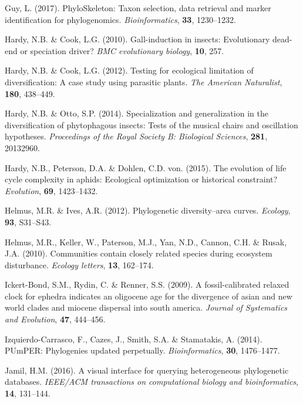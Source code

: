 \documentclass[]{article}
\begin{document}
\leavevmode\hypertarget{ref-guy2017phyloskeleton}{}%
Guy, L. (2017). PhyloSkeleton: Taxon selection, data retrieval and marker identification for phylogenomics. \emph{Bioinformatics}, \textbf{33}, 1230--1232.

\leavevmode\hypertarget{ref-hardy2010gall}{}%
Hardy, N.B. \& Cook, L.G. (2010). Gall-induction in insects: Evolutionary dead-end or speciation driver? \emph{BMC evolutionary biology}, \textbf{10}, 257.

\leavevmode\hypertarget{ref-hardy2012testing}{}%
Hardy, N.B. \& Cook, L.G. (2012). Testing for ecological limitation of diversification: A case study using parasitic plants. \emph{The American Naturalist}, \textbf{180}, 438--449.

\leavevmode\hypertarget{ref-hardy2014specialization}{}%
Hardy, N.B. \& Otto, S.P. (2014). Specialization and generalization in the diversification of phytophagous insects: Tests of the musical chairs and oscillation hypotheses. \emph{Proceedings of the Royal Society B: Biological Sciences}, \textbf{281}, 20132960.

\leavevmode\hypertarget{ref-hardy2015evolution}{}%
Hardy, N.B., Peterson, D.A. \& Dohlen, C.D. von. (2015). The evolution of life cycle complexity in aphids: Ecological optimization or historical constraint? \emph{Evolution}, \textbf{69}, 1423--1432.

\leavevmode\hypertarget{ref-helmus2012phylogenetic}{}%
Helmus, M.R. \& Ives, A.R. (2012). Phylogenetic diversity--area curves. \emph{Ecology}, \textbf{93}, S31--S43.

\leavevmode\hypertarget{ref-helmus2010communities}{}%
Helmus, M.R., Keller, W., Paterson, M.J., Yan, N.D., Cannon, C.H. \& Rusak, J.A. (2010). Communities contain closely related species during ecosystem disturbance. \emph{Ecology letters}, \textbf{13}, 162--174.

\leavevmode\hypertarget{ref-ickert2009fossil}{}%
Ickert-Bond, S.M., Rydin, C. \& Renner, S.S. (2009). A fossil-calibrated relaxed clock for ephedra indicates an oligocene age for the divergence of asian and new world clades and miocene dispersal into south america. \emph{Journal of Systematics and Evolution}, \textbf{47}, 444--456.

\leavevmode\hypertarget{ref-izquierdo2014pumper}{}%
Izquierdo-Carrasco, F., Cazes, J., Smith, S.A. \& Stamatakis, A. (2014). PUmPER: Phylogenies updated perpetually. \emph{Bioinformatics}, \textbf{30}, 1476--1477.

\leavevmode\hypertarget{ref-jamil2016visual}{}%
Jamil, H.M. (2016). A visual interface for querying heterogeneous phylogenetic databases. \emph{IEEE/ACM transactions on computational biology and bioinformatics}, \textbf{14}, 131--144.
\end{document}
